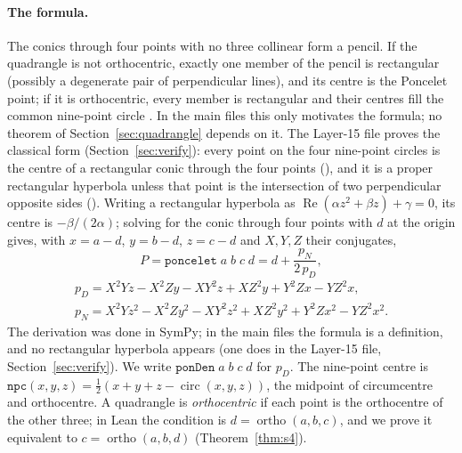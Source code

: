 \documentclass[11pt]{article}
\theoremstyle{definition}
\theoremstyle{remark}
\newcommand{\lean}[1]{\texttt{#1}}
\begin{document}
\paragraph{The formula.} The conics through four points with no three collinear form a pencil. If the
quadrangle is not orthocentric, exactly one member of the pencil is rectangular (possibly a degenerate
pair of perpendicular lines), and its centre is the Poncelet point; if it is orthocentric, every member
is rectangular and their centres fill the common nine-point circle \cite{brianchonponcelet}. In the
main files this only motivates the formula; no theorem of Section~\ref{sec:quadrangle} depends on it.
The Layer-15 file proves the classical form (Section~\ref{sec:verify}): every point on the four
nine-point circles is the centre of a rectangular conic through the four points
(), and it is a proper rectangular hyperbola unless that point is the
intersection of two perpendicular opposite sides (). Writing a rectangular hyperbola as
$\operatorname{Re}(\alpha z^2+\beta z)+\gamma=0$, its centre is $-\beta/(2\alpha)$; solving for the
conic through four points with $d$ at the origin gives, with $x=a-d$, $y=b-d$, $z=c-d$ and $X,Y,Z$
their conjugates,
\[
  P=\lean{poncelet}\;a\;b\;c\;d=d+\frac{p_N}{2\,p_D},
\]
\begin{gather*}
  p_D=X^2Yz-X^2Zy-XY^2z+XZ^2y+Y^2Zx-YZ^2x,\\
  p_N=X^2Yz^2-X^2Zy^2-XY^2z^2+XZ^2y^2+Y^2Zx^2-YZ^2x^2 .
\end{gather*}
The derivation was done in SymPy; in the main files the formula is a definition, and no rectangular
hyperbola appears (one does in the Layer-15 file, Section~\ref{sec:verify}). We write $\lean{ponDen}\;a\;b\;c\;d$ for $p_D$. The nine-point centre is
$\lean{npc}(x,y,z)=\tfrac12(x+y+z-\operatorname{circ}(x,y,z))$, the midpoint of circumcentre and
orthocentre. A quadrangle is \emph{orthocentric} if each point is the orthocentre of the other three; in Lean the condition is
$d=\operatorname{ortho}(a,b,c)$, and we prove it equivalent to $c=\operatorname{ortho}(a,b,d)$
(Theorem~\ref{thm:s4}).
\end{document}
